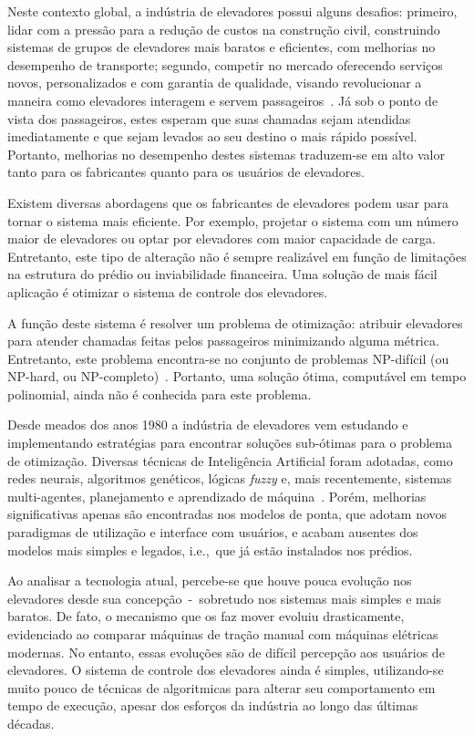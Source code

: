 Neste contexto global, a indústria de elevadores possui alguns desafios:
primeiro, lidar com a pressão para a redução de custos na construção civil,
construindo sistemas de grupos de elevadores mais baratos e eficientes, com
melhorias no desempenho de transporte; segundo, competir no mercado oferecendo
serviços novos, personalizados e com garantia de qualidade, visando revolucionar
a maneira como elevadores interagem e servem
passageiros~\cite{KOEHLEROTTIGER02}. Já sob o ponto de vista dos passageiros,
estes esperam que suas chamadas sejam atendidas imediatamente e que sejam
levados ao seu destino o mais rápido possível. Portanto, melhorias no desempenho
destes sistemas traduzem-se em alto valor tanto para os fabricantes quanto para
os usuários de elevadores.

Existem diversas abordagens que os fabricantes de elevadores podem usar para
tornar o sistema mais eficiente. Por exemplo, projetar o sistema com um número
maior de elevadores ou optar por elevadores com maior capacidade de carga.
Entretanto, este tipo de alteração não é sempre realizável em função de
limitações na estrutura do prédio ou inviabilidade financeira. Uma solução de
mais fácil aplicação é otimizar o sistema de controle dos elevadores.

A função deste sistema é resolver um problema de otimização: atribuir elevadores
para atender chamadas feitas pelos passageiros minimizando alguma métrica.
Entretanto, este problema encontra-se no conjunto de problemas NP-difícil (ou
NP-hard, ou NP-completo)~\cite{SeKo99}. Portanto, uma solução ótima, computável
em tempo polinomial, ainda não é conhecida para este problema.

Desde meados dos anos 1980 a indústria de elevadores vem estudando e
implementando estratégias para encontrar soluções sub-ótimas para o problema de
otimização. Diversas técnicas de Inteligência Artificial foram adotadas, como
redes neurais, algoritmos genéticos, lógicas \textit{fuzzy} e, mais
recentemente, sistemas multi-agentes, planejamento e aprendizado de
máquina~\cite{KOEHLEROTTIGER02}. Porém, melhorias significativas apenas são
encontradas nos modelos de ponta, que adotam novos paradigmas de utilização e
interface com usuários, e acabam ausentes dos modelos mais simples e
legados, i.e.,~que já estão instalados nos prédios.

Ao analisar a tecnologia atual, percebe-se que houve pouca evolução nos
elevadores desde sua concepção~-~sobretudo nos sistemas mais simples e mais
baratos. De fato, o mecanismo que os faz mover evoluiu drasticamente,
evidenciado ao comparar máquinas de tração manual com máquinas elétricas
modernas. No entanto, essas evoluções são de difícil percepção aos usuários de
elevadores. O sistema de controle dos elevadores ainda é simples, utilizando-se
muito pouco de técnicas de algoritmicas para alterar seu comportamento em tempo
de execução, apesar dos esforços da indústria ao longo das últimas décadas.

